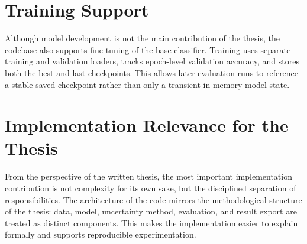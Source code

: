 \section{Training Support}

Although model development is not the main contribution of the thesis, the codebase also supports fine-tuning of the base classifier. Training uses separate training and validation loaders, tracks epoch-level validation accuracy, and stores both the best and last checkpoints. This allows later evaluation runs to reference a stable saved checkpoint rather than only a transient in-memory model state.

\section{Implementation Relevance for the Thesis}

From the perspective of the written thesis, the most important implementation contribution is not complexity for its own sake, but the disciplined separation of responsibilities. The architecture of the code mirrors the methodological structure of the thesis: data, model, uncertainty method, evaluation, and result export are treated as distinct components. This makes the implementation easier to explain formally and supports reproducible experimentation.
